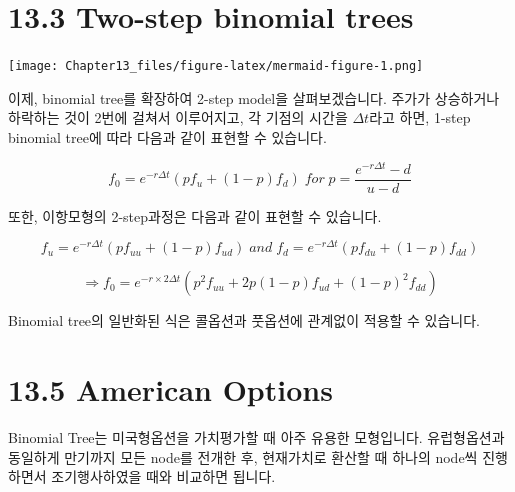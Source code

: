 \documentclass[
  letterpaper,
  DIV=11,
  numbers=noendperiod]{scrreprt}
\begin{document}
\section*{13.3 Two-step binomial trees}\label{two-step-binomial-trees}


\texttt{[image: Chapter13\_files/figure-latex/mermaid-figure-1.png]}

이제, binomial tree를 확장하여 2-step model을 살펴보겠습니다. 주가가
상승하거나 하락하는 것이 2번에 걸쳐서 이루어지고, 각 기점의 시간을
\(\Delta t\)라고 하면, 1-step binomial tree에 따라 다음과 같이 표현할 수
있습니다.

\[f_0=e^{-r\Delta t}(pf_u+(1-p)f_d)\;for\;p=\frac{e^{-r\Delta t}-d}{u-d}\]

또한, 이항모형의 2-step과정은 다음과 같이 표현할 수 있습니다.

\[f_u=e^{-r\Delta t}(pf_{uu}+(1-p)f_{ud})\;and\;f_d=e^{-r\Delta t}(pf_{du}+(1-p)f_{dd})\]

\[\Rightarrow f_0=e^{-r\times 2\Delta t}(p^2f_{uu}+2p(1-p)f_{ud}+(1-p)^2f_{dd})\]

\begin{tcolorbox}[enhanced jigsaw, toprule=.15mm, breakable, left=2mm, leftrule=.75mm, opacitybacktitle=0.6, coltitle=black, rightrule=.15mm, colback=white, titlerule=0mm, bottomtitle=1mm, colframe=quarto-callout-note-color-frame, title=\textcolor{quarto-callout-note-color}{\faInfo}\hspace{0.5em}{13.4 Put options example}, toptitle=1mm, arc=.35mm, colbacktitle=quarto-callout-note-color!10!white, opacityback=0, bottomrule=.15mm]

Binomial tree의 일반화된 식은 콜옵션과 풋옵션에 관계없이 적용할 수
있습니다.

\end{tcolorbox}

\section*{13.5 American Options}\label{american-options}


Binomial Tree는 미국형옵션을 가치평가할 때 아주 유용한 모형입니다.
유럽형옵션과 동일하게 만기까지 모든 node를 전개한 후, 현재가치로 환산할
때 하나의 node씩 진행하면서 조기행사하였을 때와 비교하면 됩니다.
\end{document}
